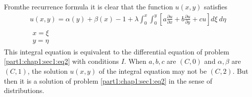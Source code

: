 \begin{remark*}
  From\pageoriginale the recurrence formula it is clear that the
  function $u(x,y)$ satisfies 
  \begin{multline*}
  u(x,y) = \alpha(y) + \beta (x) -1 + \lambda \int^x_0 \int^y_0 \left[
    a \frac{\partial u}{\partial x} + b \frac{\partial u}{\partial y}+
    cu \right] d \xi ~ d \eta~\\ 
  {\substack{x=\xi\\ y = \eta}}\qquad \quad  
  \end{multline*}
  This integral equation is equivalent to the differential equation of
  problem \ref{part1:chap1:sec1:eq2} with conditions $I$. When $a, b, c$ are $(C, 0)$ and
  $\alpha, \beta$ are $(C, 1)$, the solution $u(x,y)$ of the integral
  equation may not be $(C,2)$. But then it is a solution of problem
  \ref{part1:chap1:sec1:eq2} in the sense of distributions. 
\end{remark*}
